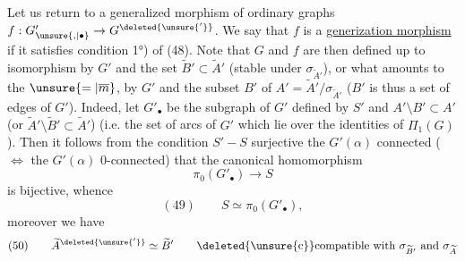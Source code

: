 Let us return to a generalized morphism of ordinary graphs $f:G'_{\unsure{,|\bullet}}\to G^{\deleted{\unsure{'}}}$. We say that $f$ is a \uline{generization morphism} if it satisfies condition 1°) of (48). Note that $G$ and $f$ are then defined up to isomorphism by $G'$ and the set $\widetilde B'\subset\widetilde A'$ (stable under $\sigma_{\widetilde A'}$), or what amounts to the $\unsure{=|\overline m}$, by $G'$ and the  subset $B'$ of $A'=\widetilde A'/\sigma_{\widetilde A'}$ ($B'$ is thus a set of edges of $G'$). Indeed, let $G'_\bullet$ be the subgraph of $G'$ defined by $S'$ and $A'\setminus B'\subset A'$ (or $\widetilde A'\setminus\widetilde B'\subset\widetilde A'$) (i.e.  the set of  arcs of $G'$ which lie over the identities of $\Pi_1(G)$). Then it follows from the condition $S'{-}S$ surjective  the $G'(\alpha)$ connected ($\Longleftrightarrow$ the $G'(\alpha)$ 0-connected) that  the canonical homomorphism
\[
\pi_0(G'_\bullet)\longrightarrow S
\]
is bijective, whence
\[
(49)\qquad S\simeq\pi_0(G'_\bullet),
\]
moreover we have
\[
(50)\qquad\widetilde A^{\deleted{\unsure{'}}}\simeq\widetilde B'\qquad\deleted{\unsure{\mathrm c}}\text{compatible with }\sigma_{\widetilde B'}\text{ and }\sigma_{\widetilde A}
\]
